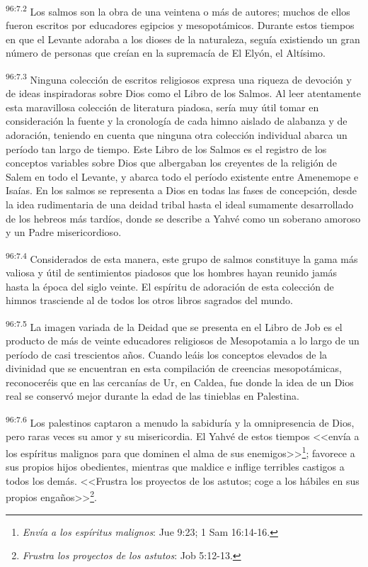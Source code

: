 \par
\textsuperscript{96:7.2} Los salmos son la obra de una veintena o más de autores; muchos de ellos fueron escritos por educadores egipcios y mesopotámicos. Durante estos tiempos en que el Levante adoraba a los dioses de la naturaleza, seguía existiendo un gran número de personas que creían en la supremacía de El Elyón, el Altísimo.

\par
\textsuperscript{96:7.3} Ninguna colección de escritos religiosos expresa una riqueza de devoción y de ideas inspiradoras sobre Dios como el Libro de los Salmos. Al leer atentamente esta maravillosa colección de literatura piadosa, sería muy útil tomar en consideración la fuente y la cronología de cada himno aislado de alabanza y de adoración, teniendo en cuenta que ninguna otra colección individual abarca un período tan largo de tiempo. Este Libro de los Salmos es el registro de los conceptos variables sobre Dios que albergaban los creyentes de la religión de Salem en todo el Levante, y abarca todo el período existente entre Amenemope e Isaías. En los salmos se representa a Dios en todas las fases de concepción, desde la idea rudimentaria de una deidad tribal hasta el ideal sumamente desarrollado de los hebreos más tardíos, donde se describe a Yahvé como un soberano amoroso y un Padre misericordioso.

\par
\textsuperscript{96:7.4} Considerados de esta manera, este grupo de salmos constituye la gama más valiosa y útil de sentimientos piadosos que los hombres hayan reunido jamás hasta la época del siglo veinte. El espíritu de adoración de esta colección de himnos trasciende al de todos los otros libros sagrados del mundo.

\par
\textsuperscript{96:7.5} La imagen variada de la Deidad que se presenta en el Libro de Job es el producto de más de veinte educadores religiosos de Mesopotamia a lo largo de un período de casi trescientos años. Cuando leáis los conceptos elevados de la divinidad que se encuentran en esta compilación de creencias mesopotámicas, reconoceréis que en las cercanías de Ur, en Caldea, fue donde la idea de un Dios real se conservó mejor durante la edad de las tinieblas en Palestina.

\par
\textsuperscript{96:7.6} Los palestinos captaron a menudo la sabiduría y la omnipresencia de Dios, pero raras veces su amor y su misericordia. El Yahvé de estos tiempos <<envía a los espíritus malignos para que dominen el alma de sus enemigos>>\footnote{\textit{Envía a los espíritus malignos}: Jue 9:23; 1 Sam 16:14-16.}; favorece a sus propios hijos obedientes, mientras que maldice e inflige terribles castigos a todos los demás. <<Frustra los proyectos de los astutos; coge a los hábiles en sus propios engaños>>\footnote{\textit{Frustra los proyectos de los astutos}: Job 5:12-13.}.

